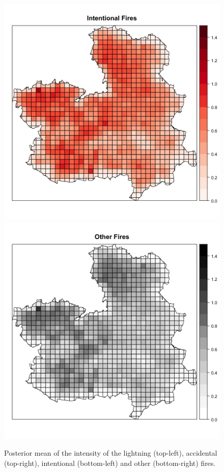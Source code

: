 \begin{figure}[h!]
\begin{center}
\includegraphics[scale=0.40]{images/CLMFires_intentional.png}
\includegraphics[scale=0.40]{images/CLMFires_other.png}
\end{center}
\caption{Posterior mean of the intensity of the lightning (top-left), accidental (top-right), intentional (bottom-left) and other (bottom-right) fires.}
\label{fig:clmfires:est1}
\end{figure}

